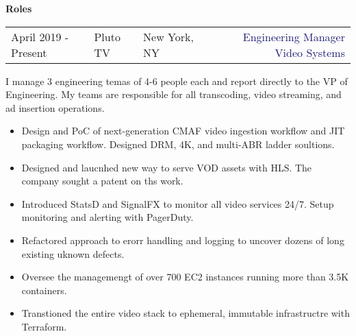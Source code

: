 \documentclass[12t]{article}
\begin{document}
\vspace{10pt}\textbf{Roles}

\vspace{5pt}\begin{tabularx}{\textwidth}{@{}lllXr}
  April 2019 - Present&\textcolor{Mahogany}{Pluto TV}&\textcolor{Black!80}{New York, NY}&&\textcolor{MidnightBlue}{Engineering Manager Video Systems}
\end{tabularx}

\vspace{3pt} I manage 3 engineering temas of 4-6 people each and report directly to the VP of Engineering. My teams are responsible for
all transcoding, video streaming, and ad insertion operations.
\begin{multicols}{2}
  \begin{small}
    \begin{itemize}[leftmargin=*,label=\tiny{$\bullet$}]
    \item\begin{minipage}[t]{\linewidth}{Design and PoC of next-generation CMAF video ingestion workflow and JIT packaging workflow.
        Designed DRM, 4K, and multi-ABR ladder soultions.}\end{minipage}
    \item\begin{minipage}[t]{\linewidth}{Designed and laucnhed new way to serve VOD assets with HLS. The company sought a patent on ths work.}\end{minipage}
    \item\begin{minipage}[t]{\linewidth}{Introduced StatsD and SignalFX to monitor all video services 24/7. Setup monitoring
        and alerting with PagerDuty.}\end{minipage}
    \item\begin{minipage}[t]{\linewidth}{Refactored approach to erorr handling and logging to uncover dozens of long existing uknown defects.}\end{minipage}
    \item\begin{minipage}[t]{\linewidth}{Oversee the managemengt of over 700 EC2 instances running more than 3.5K containers.}\end{minipage}
    \item\begin{minipage}[t]{\linewidth}{Transtioned the entire video stack to ephemeral, immutable infrastructre with Terraform.}\end{minipage}

\end{itemize}
\end{small}
\end{multicols}
\end{document}
